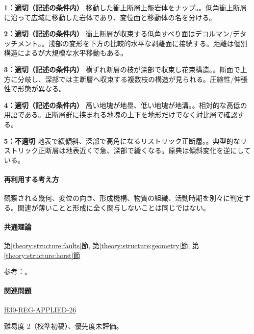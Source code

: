 \noindent\textbf{1：適切（記述の条件内）} 移動した衝上断層上盤岩体をナップ。。低角衝上断層に沿って広域に移動した岩体であり、変位面と移動体の名を分ける。\par

\noindent\textbf{2：適切（記述の条件内）} 衝上断層が収束する低角すべり面はデコルマン/デタッチメント。。浅部の変形を下方の比較的水平な剥離面に接続する。距離は個別構造によるが大規模な水平移動もある。\par

\noindent\textbf{3：適切（記述の条件内）} 横ずれ断層の枝が深部で収束し花束構造。。断面で上方に分岐し、深部では主断層へ収束する複数枝の構造が見られる。圧縮性/伸張性で形態が異なる。\par

\noindent\textbf{4：適切（記述の条件内）} 高い地塊が地塁、低い地塊が地溝。。相対的な高低の用語である。正断層群に挟まれる地塊の上下を地形だけでなく対比層で確認する。\par

\noindent\textbf{5：不適切} 地表で緩傾斜、深部で高角になるリストリック正断層。。典型的なリストリック正断層は地表近くで急、深部で緩くなる。原典は傾斜変化を逆にしている。\par

\paragraph{再利用する考え方} 観察される幾何、変位の向き、形成機構、物質の組織、活動時期を別々に判定する。関連が薄いことと形成に全く関与しないことは同じではない。

\paragraph{共通理論} \hyperref[theory:structure:faults]{第\ref*{theory:structure:faults}節}, \hyperref[theory:structure:geometry]{第\ref*{theory:structure:geometry}節}, \hyperref[theory:structure:horst]{第\ref*{theory:structure:horst}節}

\par 参考：\cite{str_listric,str_source}。

\paragraph{関連問題} \hyperref[q:h30-reg-applied-26]{H30-REG-APPLIED-26}

\par 難易度 2（校準初稿）、優先度未評価。


